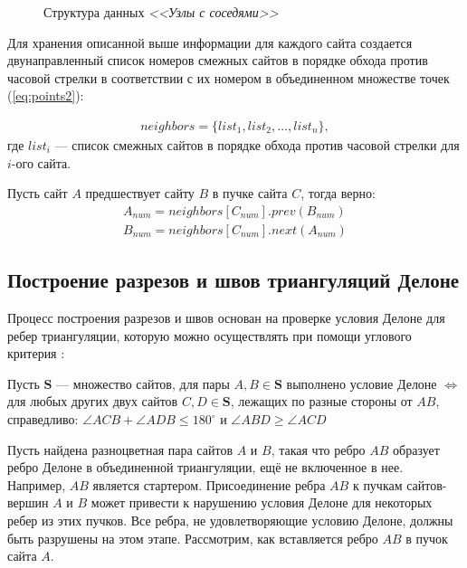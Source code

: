 \documentclass[12pt]{article}
\begin{document}
\begin{figure}[htb!]
	\caption{Структура данных {\itshape <<Узлы с соседями>>}}
	\label{pic:struct}
\end{figure}

Для хранения описанной выше информации для каждого сайта создается двунаправленный список номеров смежных сайтов
в порядке обхода против часовой стрелки
в соответствии с их номером в объединенном множестве точек (\ref{eq:points2}):

\begin{equation}\label{eq:neib}
\begin{split}
	neighbors = \{list_1, list_2, \ldots, list_n\},
\end{split}
\end{equation}
где $list_i$ --- список смежных сайтов в порядке обхода против часовой стрелки для $i$-ого сайта.

Пусть сайт $A$ предшествует сайту $B$ в пучке сайта $C$, тогда верно:
\begin{equation}\label{eq:op}
\begin{split}
	A_{num} = neighbors[C_{num}].prev(B_{num}) \\
	B_{num} = neighbors[C_{num}].next(A_{num})
\end{split}
\end{equation}

\subsection{Построение разрезов и швов триангуляций Делоне}
Процесс построения разрезов и швов основан на проверке условия Делоне для ребер триангуляции,
которую можно осуществлять при помощи углового критерия \cite{MestOverlap} :

\begin{lemma}
\label{th:lem1}
Пусть $\textbf{S}$ --- множество сайтов, для пары $A, B \in \textbf{S}$ выполнено условие Делоне $\Leftrightarrow$
для любых других двух сайтов $C, D \in \textbf{S}$, лежащих по разные стороны от $AB$, справедливо:
$\angle ACB + \angle ADB \le 180^\circ$ и $\angle ABD \ge \angle ACD$
\end{lemma}

Пусть найдена разноцветная пара сайтов $A$ и $B$, такая что ребро $AB$ образует ребро Делоне в объединенной триангуляции,
ещё не включенное в нее.
Например, $AB$ является стартером.
Присоединение ребра $AB$ к пучкам сайтов-вершин $A$ и $B$ может привести к нарушению условия Делоне для некоторых ребер из этих пучков.
Все ребра, не удовлетворяющие условию Делоне, должны быть разрушены на этом этапе.
Рассмотрим, как вставляется ребро $AB$ в пучок сайта $A$.
\end{document}
